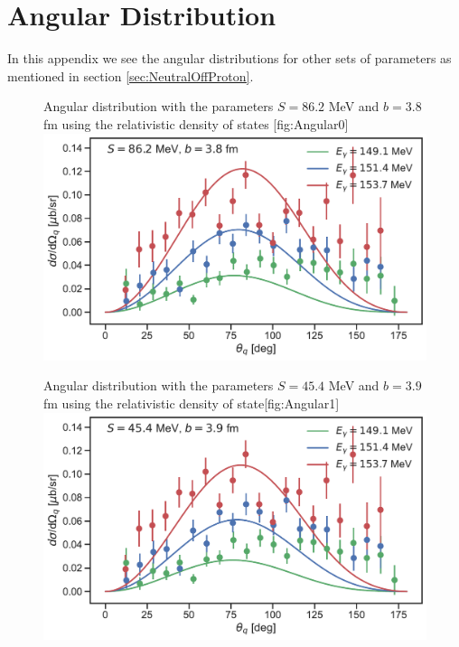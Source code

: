 \chapter{Angular Distribution}\label{sec:Angular}
In this appendix we see the angular distributions for other sets of parameters as mentioned in section \ref{sec:NeutralOffProton}.
\begin{figure}[H]
	\begin{sidecaption}{Angular distribution with the parameters $S=86.2$ MeV and $b=3.8$ fm using the relativistic density of states }[fig:Angular0]
		\includegraphics[width=\linewidth]{Figures/MultiDiffcross_rel.pdf}
	\end{sidecaption}
\end{figure}
\begin{figure}[H]
	\begin{sidecaption}{Angular distribution with the parameters $S=45.4$ MeV and $b=3.9$ fm using the relativistic density of state}[fig:Angular1]
		\includegraphics[width=\linewidth]{Figures/MultiDiffcross_rel_2.pdf}
	\end{sidecaption}
\end{figure}
